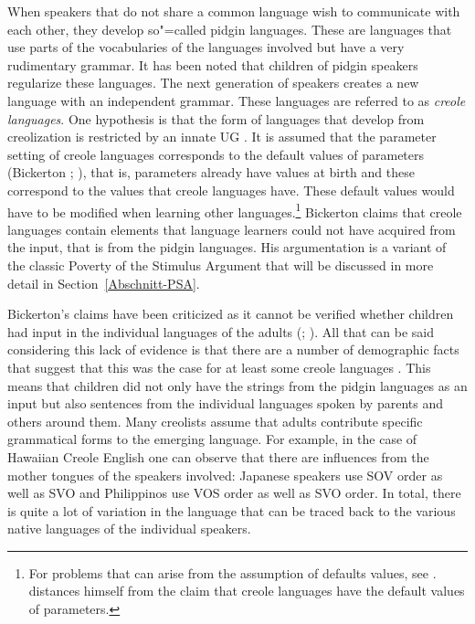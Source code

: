 \addlines
When speakers that do not share a common language wish to communicate with each other, they develop so"=called
pidgin languages. These are languages that use parts of the vocabularies of the languages involved but have a very rudimentary
grammar. It has been noted that children of pidgin speakers regularize these languages. The next generation of speakers creates a new language with an independent
grammar. These languages are referred to as \emph{creole languages}.
One hypothesis is that the form of languages that develop from creolization is restricted by an innate UG \citep{Bickerton84a}. It is assumed that
the parameter setting of creole languages corresponds to the default values of parameters (Bickerton \citeyear[]{Bickerton84b};
\citeyear[]{Bickerton84a}), that is, parameters already have values at birth and these
correspond to the values that creole languages have. These default values would have to be modified when learning other languages.\footnote{%
	For problems that can arise from the assumption of defaults values, see  . \citet[, fn.\,13]{Bickerton97a} distances himself from the claim that creole languages have
  the default values of parameters.
} 
Bickerton claims that creole languages contain elements that language learners could not have
acquired from the input, that is from the pidgin languages. His argumentation is a variant of the classic Poverty of the Stimulus Argument that will be discussed in more detail in Section~\ref{Abschnitt-PSA}.

Bickerton's claims have been criticized as it cannot be verified whether children had input in the individual languages
of the adults (\citealp[]{Samarin84a}; \citealp[]{Seuren84a}). All that can be said considering this lack of evidence is that there are a number
of demographic facts that suggest that this was the case for at least some creole languages
\citep{Arends2008a}.
This means that children did not only have the strings from the pidgin languages as an input but
also sentences from the individual languages spoken by parents and others around them. Many creolists assume that adults contribute specific grammatical forms to the emerging language. For example, in the case of Hawaiian Creole English
one can observe that there are influences from the mother tongues of the speakers involved: Japanese speakers use SOV order as well as SVO and Philippinos use VOS order as well
as SVO order. In total, there is quite a lot of variation in the language that can be traced back to the various native languages of the individual speakers.

